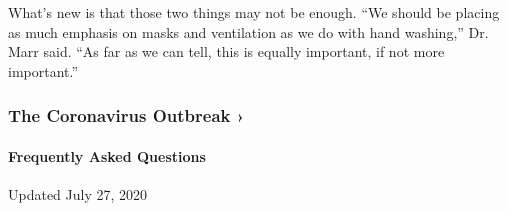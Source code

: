 What's new is that those two things may not be enough. ``We should be
placing as much emphasis on masks and ventilation as we do with hand
washing,'' Dr. Marr said. ``As far as we can tell, this is equally
important, if not more important.''

\href{https://www.nytimes3xbfgragh.onion/news-event/coronavirus?action=click\&pgtype=Article\&state=default\&region=MAIN_CONTENT_3\&context=storylines_faq}{}

\hypertarget{the-coronavirus-outbreak-}{%
\subsubsection{The Coronavirus Outbreak
›}\label{the-coronavirus-outbreak-}}

\hypertarget{frequently-asked-questions}{%
\paragraph{Frequently Asked
Questions}\label{frequently-asked-questions}}

Updated July 27, 2020

